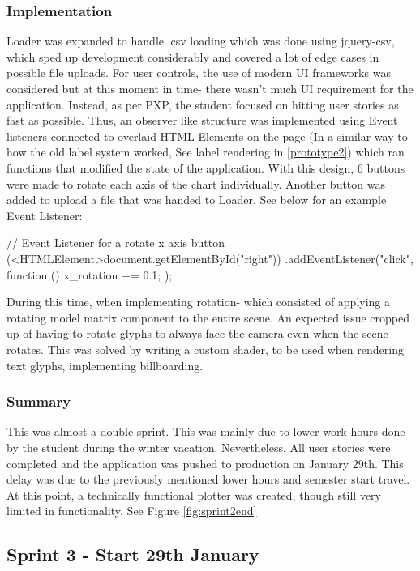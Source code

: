 \subsubsection{Implementation}
Loader was expanded to handle .csv loading which was done using jquery-csv, which sped up development considerably and covered a lot of edge cases in possible file uploads. For user controls, the use of modern UI frameworks was considered but at this moment in time- there wasn't much UI requirement for the application. Instead, as per PXP, the student focused on hitting user stories as fast as possible. Thus, an observer like structure was implemented using Event listeners connected to overlaid HTML Elements on the page (In a similar way to how the old label system worked, See label rendering in \ref{prototype2}) which ran functions that modified the state of the application. With this design, 6 buttons were made to rotate each axis of the chart individually. Another button was added to upload a file that was handed to Loader. See below for an example Event Listener:

\begin{code}
    // Event Listener for a rotate x axis button
    (<HTMLElement>document.getElementById("right"))
    .addEventListener("click", function () {
            x_rotation += 0.1;
        });
\end{code}

During this time, when implementing rotation- which consisted of applying a rotating model matrix component to the entire scene. An expected issue cropped up of having to rotate glyphs to always face the camera even when the scene rotates. This was solved by writing a custom shader, to be used when rendering text glyphs, implementing billboarding.

\subsubsection{Summary}
This was almost a double sprint. This was mainly due to lower work hours done by the student during the winter vacation. Nevertheless, All user stories were completed and the application was pushed to production on January 29th. This delay was due to the previously mentioned lower hours and semester start travel. At this point, a technically functional plotter was created, though still very limited in functionality. See Figure \ref{fig:sprint2end}

\subsection{Sprint 3 - Start 29th January}
